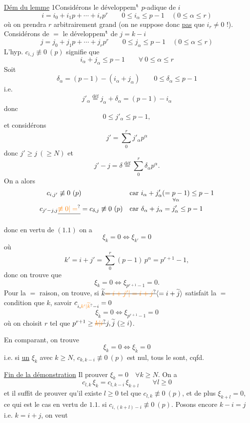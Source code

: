\uline{Dém du lemme} 1\quad Considérons le développem$^{\rm t}$ $p$-adique de $i$
\[
 i=i_0+i_1p+\cdots+i_rp^r \qquad 0\leq i_\alpha\leq p-1\quad(0\leq\alpha\leq r)
\]
où on prendra $r$ arbitrairement grand (on ne suppose donc \uline{pas} que $i_r\neq0$ !). Considérons de $=$ le développem$^{\rm t}$ de $j=k-i$
\[
 j=j_0+j_1p+\cdots+j_rp^r\qquad 0\leq j_\alpha\leq p-1\quad(0\leq\alpha\leq r)
\]
L'hyp. $c_{i,j}\not\equiv0\ (p)$ signifie que
\[
 i_\alpha+j_\alpha\leq p-1\qquad\forall\ 0\leq\alpha\leq r
\]
Soit \deleted{\unsure{$\delta_\alpha$}}
\[
 \delta_\alpha=(p-1)-(i_\alpha+j_\alpha)\qquad 0\leq\delta_\alpha\leq p-1
\]
i.e.
\[
 j'_\alpha\overset{\text{déf}}{=}j_\alpha+\delta_\alpha=(p-1)-i_\alpha
\]
donc
\[
 0\leq j'_\alpha\leq p-1,
\]
et considérons
\[
 j'=\sum_0^r j'_\alpha p^\alpha
\]
donc $j'\geq j\ (\geq N)$ et
\[
 j'-j=\delta\overset{\text{déf}}{=}\sum_0^r\delta_\alpha p^\alpha.
\]
On a alors 
\[
\begin{aligned}
 c_{i,j'}&\not\equiv0\ (p) &&\text{car }i_\alpha+j'_\alpha\underset{\forall\alpha}{(=p-1)}\leq p-1\\
 c_{j'-j,j}&\deleted{\unsure{\not\equiv0|=}}=c_{\delta,j}\not\equiv0\ (p) &&\text{car }\delta_\alpha+j_\alpha=j'_\alpha\leq p-1
\end{aligned}
\]

donc en vertu de $(1.1)$ on a
\[
 \xi_k=0\Longleftrightarrow\xi_{k'}=0
\]
où
\[
 k'=i+j'=\sum_0^r(p-1)\,p^\alpha=p^{r+1}-1,
\]
donc on trouve que
\[
 \xi_k=0\Longleftrightarrow\xi_{p^{r+1}-1}=0.
\]
Pour la $=$ raison, on trouve, si $\widetilde k\deleted{\unsure{=i+j'|=i+j}}\inserted{=i+\widetilde j}$ satisfait la $=$ condition que $k$, savoir $c_{i,\unsure{k'|\widetilde k}-i}=0$
\[
 \xi_{\widetilde k}=0\Longleftrightarrow\xi_{p^{r+1}-1}=0
\]
où on choisit $r$ tel que $p^{r+1}\geq\deleted{\unsure{k|i}}j,\widetilde j\ (\geq i)$.

En comparant, on trouve
\[
 \xi_k=0\Longleftrightarrow\xi_{\widetilde k}=0
\]
i.e. si \uline{un} $\xi_k$ avec $k\geq N$, $c_{k,k-i}\not\equiv0\ (p)$ est nul, tous le sont, cqfd.

\uline{Fin de la démonstration} Il  prouver $\xi_k=0\quad\forall k\geq N$. On a
\[
 c_{l,k}\,\xi_k=c_{l,k-i}\,\xi_{k+l}\qquad\forall l\geq0
\]
et il suffit de prouver qu'il existe $l\geq0$ tel que $c_{l,k}\not\equiv0\ (p)$, et de plus $\xi_{k+l}=0$, ce qui est le cas  en vertu de $1.1.$ si $c_{i,(k+l)-i}\not\equiv0\ (p)$. Posons encore $k-i=j$ i.e. $k=i+j$, on veut

